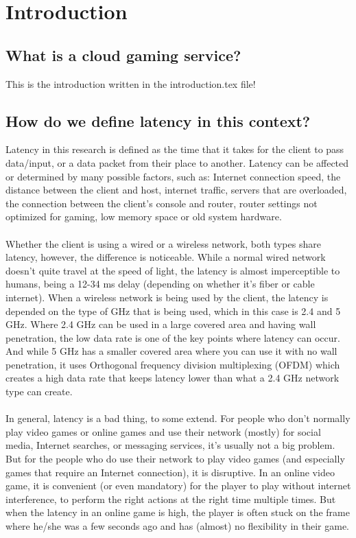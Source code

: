 \section{Introduction}

\subsection{What is a cloud gaming service?}
This is the introduction written in the introduction.tex file!

\subsection{How do we define latency in this context?}
Latency in this research is defined as the time that it takes for the client to pass data/input, or a data packet from their place to another. Latency can be affected or determined by many possible factors, such as: Internet connection speed, the distance between the client and host, internet traffic, servers that are overloaded, the connection between the client's console and router, router settings not optimized for gaming, low memory space or old system hardware.\\\\
Whether the client is using a wired or a wireless network, both types share latency, however, the difference is noticeable. While a normal wired network doesn't quite travel at the speed of light, the latency is almost imperceptible to humans, being a 12-34 ms delay (depending on whether it's fiber or cable internet). When a wireless network is being used by the client, the latency is depended on the type of GHz that is being used, which in this case is 2.4 and 5 GHz. Where 2.4 GHz can be used in a large covered area and having wall penetration, the low data rate is one of the key points where latency can occur. And while 5 GHz has a smaller covered area where you can use it with no wall penetration, it uses Orthogonal frequency division multiplexing (OFDM) which creates a high data rate that keeps latency lower than what a 2.4 GHz network type can create.\\\\
In general, latency is a bad thing, to some extend. For people who don't normally play video games or online games and use their network (mostly) for social media, Internet searches, or messaging services, it's usually not a big problem. But for the people who do use their network to play video games (and especially games that require an Internet connection), it is disruptive. In an online video game, it is convenient (or even mandatory) for the player to play without internet interference, to perform the right actions at the right time multiple times. But when the latency in an online game is high, the player is often stuck on the frame where he/she was a few seconds ago and has (almost) no flexibility in their game.